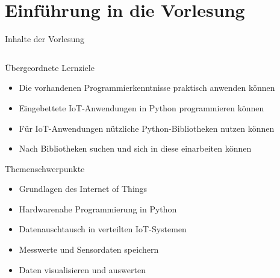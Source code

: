 \section{Einführung in die Vorlesung}

{
\scriptsize

\begin{frame}{Inhalte der Vorlesung}
    \begin{columns}
        \begin{column}[T]{.7\textwidth}
            \begin{block}{Übergeordnete Lernziele}
                \begin{itemize}
                    \item Die vorhandenen Programmierkenntnisse praktisch anwenden können
                    \item Eingebettete IoT-Anwendungen in Python programmieren können
                    \item Für IoT-Anwendungen nützliche Python-Bibliotheken nutzen können
                    \item Nach Bibliotheken suchen und sich in diese einarbeiten können
                \end{itemize}
            \end{block}

            \begin{block}{Themenschwerpunkte}
                \begin{itemize}
                    \item Grundlagen des Internet of Things
                    \item Hardwarenahe Programmierung in Python
                    \item Datenauschtausch in verteilten IoT-Systemen
                    \item Messwerte und Sensordaten speichern
                    \item Daten visualisieren und auswerten
                \end{itemize}
            \end{block}
        \end{column}


\end{columns}
\end{frame}}
